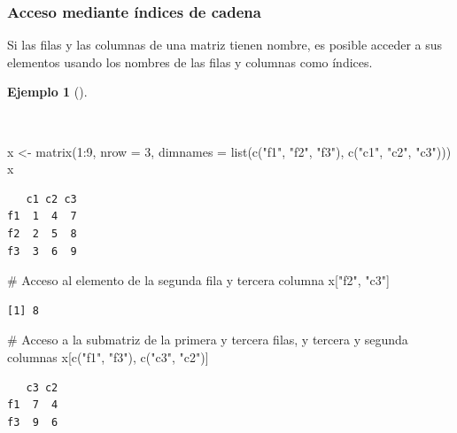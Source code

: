 \documentclass[
  a4paper,
]{scrreport}
\newenvironment{Shaded}{\begin{snugshade}}{\end{snugshade}}
\newcommand{\AttributeTok}[1]{\textcolor[rgb]{0.40,0.45,0.13}{#1}}
\newcommand{\CommentTok}[1]{\textcolor[rgb]{0.37,0.37,0.37}{#1}}
\newcommand{\DecValTok}[1]{\textcolor[rgb]{0.68,0.00,0.00}{#1}}
\newcommand{\FunctionTok}[1]{\textcolor[rgb]{0.28,0.35,0.67}{#1}}
\newcommand{\NormalTok}[1]{\textcolor[rgb]{0.00,0.23,0.31}{#1}}
\newcommand{\OtherTok}[1]{\textcolor[rgb]{0.00,0.23,0.31}{#1}}
\newcommand{\SpecialCharTok}[1]{\textcolor[rgb]{0.37,0.37,0.37}{#1}}
\newcommand{\StringTok}[1]{\textcolor[rgb]{0.13,0.47,0.30}{#1}}
\theoremstyle{definition}
\theoremstyle{definition}
\newtheorem{example}{Ejemplo}[chapter]
\theoremstyle{remark}
\begin{document}
\subsubsection{Acceso mediante índices de
cadena}\label{acceso-mediante-uxedndices-de-cadena}

Si las filas y las columnas de una matriz tienen nombre, es posible
acceder a sus elementos usando los nombres de las filas y columnas como
índices.

\begin{example}[]\protect\hypertarget{exm-acceso-matriz-nombres}{}\label{exm-acceso-matriz-nombres}

~

\begin{Shaded}
\begin{Highlighting}[]
\NormalTok{x }\OtherTok{\textless{}{-}} \FunctionTok{matrix}\NormalTok{(}\DecValTok{1}\SpecialCharTok{:}\DecValTok{9}\NormalTok{, }\AttributeTok{nrow =} \DecValTok{3}\NormalTok{, }\AttributeTok{dimnames =} \FunctionTok{list}\NormalTok{(}\FunctionTok{c}\NormalTok{(}\StringTok{"f1"}\NormalTok{, }\StringTok{"f2"}\NormalTok{, }\StringTok{"f3"}\NormalTok{), }\FunctionTok{c}\NormalTok{(}\StringTok{"c1"}\NormalTok{, }\StringTok{"c2"}\NormalTok{, }\StringTok{"c3"}\NormalTok{)))}
\NormalTok{x}
\end{Highlighting}
\end{Shaded}

\begin{verbatim}
   c1 c2 c3
f1  1  4  7
f2  2  5  8
f3  3  6  9
\end{verbatim}

\begin{Shaded}
\begin{Highlighting}[]
\CommentTok{\# Acceso al elemento de la segunda fila y tercera columna}
\NormalTok{x[}\StringTok{"f2"}\NormalTok{, }\StringTok{"c3"}\NormalTok{]}
\end{Highlighting}
\end{Shaded}

\begin{verbatim}
[1] 8
\end{verbatim}

\begin{Shaded}
\begin{Highlighting}[]
\CommentTok{\# Acceso a la submatriz de la primera y tercera filas, y tercera y segunda columnas}
\NormalTok{x[}\FunctionTok{c}\NormalTok{(}\StringTok{"f1"}\NormalTok{, }\StringTok{"f3"}\NormalTok{), }\FunctionTok{c}\NormalTok{(}\StringTok{"c3"}\NormalTok{, }\StringTok{"c2"}\NormalTok{)]}
\end{Highlighting}
\end{Shaded}

\begin{verbatim}
   c3 c2
f1  7  4
f3  9  6
\end{verbatim}

\end{example}
\end{document}
